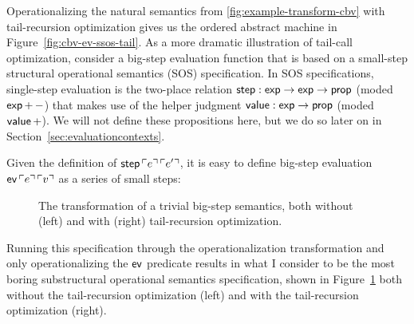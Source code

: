 Operationalizing the natural semantics from
\ref{fig:example-transform-cbv} with tail-recursion optimization gives
us the ordered abstract machine in Figure~\ref{fig:cbv-ev-ssos-tail}.
As a more dramatic illustration of tail-call optimization, consider a
big-step evaluation function that is based on a small-step structural
operational semantics (SOS) specification. In SOS specifications,
single-step evaluation is the two-place relation ${\sf step} : {\sf
  exp} \rightarrow {\sf exp} \rightarrow {\sf prop}$ (moded ${\sf
  exp}\,{+}\,{-}$) that makes use of the helper judgment ${\sf value}
: {\sf exp} \rightarrow {\sf prop}$ (moded ${\sf value}\,{+}$). We
will not define these propositions here, but we do so later on in
Section~\ref{sec:evaluationcontexts}.

Given the definition of ${\sf step}\,{\ulcorner{e}\urcorner}\,{\ulcorner{e'}\urcorner}$, it is
easy to define big-step evaluation ${\sf ev}\,{\ulcorner{e}\urcorner}\,{\ulcorner{v}\urcorner}$
as a series of small steps:

\smallskip
{}
\smallskip

\begin{figure}
\begin{minipage}[b]{0.55\linewidth}
\end{minipage}
\hspace{0.5cm}
\begin{minipage}[b]{0.45\linewidth}
\end{minipage}
\caption{The transformation of a trivial big-step semantics, both
  without (left) and with (right) tail-recursion optimization.}
\label{fig:sos-tailrecursion}
\end{figure}

Running this specification through the operationalization
transformation and only operationalizing the ${\sf ev}$ predicate
results in what I consider to be the most boring substructural
operational semantics specification, shown in
Figure~\ref{fig:sos-tailrecursion} both without the tail-recursion
optimization (left) and with the tail-recursion optimization (right).


